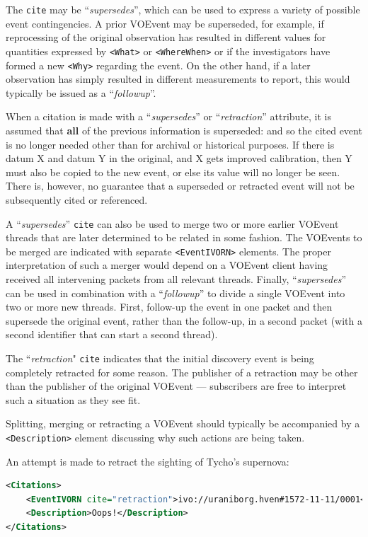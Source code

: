 \documentclass[11pt,a4paper]{ivoa}
\begin{document}
The {\tt cite} may be ``\emph{supersedes}'', which can be used to express a variety of possible event contingencies. A prior VOEvent may be superseded, for example, if reprocessing of the original observation has resulted in different values for quantities expressed by {\tt <What>} or {\tt <WhereWhen>} or if the investigators have formed a new {\tt <Why>} regarding the event. On the other hand, if a later observation has simply resulted in different measurements to report, this would typically be issued as a ``\emph{followup}''. 

When a citation is made with a ``\emph{supersedes}'' or ``\emph{retraction}'' attribute, it is assumed that {\bf all} of the previous information is superseded: and so the cited event is no longer needed other than for archival or historical purposes. If there is datum X and datum Y in the original, and X gets improved calibration, then Y must also be copied to the new event, or else its value will no longer be seen. There is, however, no guarantee that a superseded or retracted event will not be subsequently cited or referenced. 

A ``\emph{supersedes}'' {\tt cite} can also be used to merge two or more earlier VOEvent threads that are later determined to be related in some fashion. The VOEvents to be merged are indicated with separate {\tt <EventIVORN>} elements. The proper interpretation of such a merger would depend on a VOEvent client having received all intervening packets from all relevant threads. Finally, ``\emph{supersedes}'' can be used in combination with a ``\emph{followup}'' to divide a single VOEvent into two or more new threads. First, follow-up the event in one packet and then supersede the original event, rather than the follow-up, in a second packet (with a second identifier that can start a second thread). 

The ``\emph{retraction}" {\tt cite} indicates that the initial discovery event is being completely retracted for some reason. The publisher of a retraction may be other than the publisher of the original VOEvent --- subscribers are free to interpret such a situation as they see fit. 

Splitting, merging or retracting a VOEvent should typically be accompanied by a {\tt <Description>} element discussing why such actions are being taken. 

An attempt is made to retract the sighting of Tycho's supernova: 
\begin{lstlisting}[language=XML]
<Citations>
    <EventIVORN cite="retraction">ivo://uraniborg.hven#1572-11-11/0001</EventIVORN>     
    <Description>Oops!</Description>
</Citations> 
\end{lstlisting}
\end{document}
